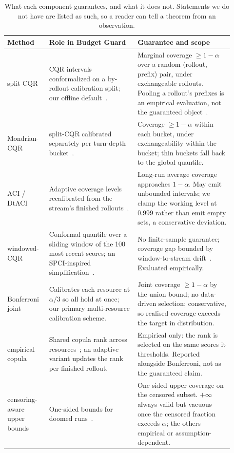 \documentclass{article}
\begin{document}
\begin{table}[t]
\centering
\caption{What each component guarantees, and what it does not. Statements we do not have are listed as such, so a reader can tell a theorem from an observation.}
\label{tab:guarantees}
\footnotesize
\begin{tabular}{@{}p{0.17\linewidth}p{0.36\linewidth}p{0.39\linewidth}@{}}
\toprule
Method & Role in Budget Guard & Guarantee and scope \\
\midrule
split-CQR & CQR intervals conformalized on a by-rollout calibration split; our offline default~\cite{romano2019cqr}. & Marginal coverage $\ge 1{-}\alpha$ over a random (rollout, prefix) pair, under exchangeable rollouts. Pooling a rollout's prefixes is an empirical evaluation, not the guaranteed object~\cite{lei2018distribution}. \\
Mondrian-CQR & split-CQR calibrated separately per turn-depth bucket~\cite{vovk2012conditional}. & Coverage $\ge 1{-}\alpha$ within each bucket, under exchangeability within the bucket; thin buckets fall back to the global quantile. \\
ACI / DtACI & Adaptive coverage levels recalibrated from the stream's finished rollouts~\cite{gibbs2021aci,gibbs2024dtaci}. & Long-run average coverage approaches $1{-}\alpha$. May emit unbounded intervals; we clamp the working level at 0.999 rather than emit empty sets, a conservative deviation. \\
windowed-CQR & Conformal quantile over a sliding window of the 100 most recent scores; an SPCI-inspired simplification~\cite{xu2023spci}. & No finite-sample guarantee; coverage gap bounded by window-to-stream drift~\cite{barber2023beyond}. Evaluated empirically. \\
Bonferroni joint & Calibrates each resource at $\alpha/3$ so all hold at once; our primary multi-resource calibration scheme. & Joint coverage $\ge 1{-}\alpha$ by the union bound; no data-driven selection; conservative, so realised coverage exceeds the target in distribution. \\
empirical copula & Shared copula rank across resources~\cite{messoudi2021copula}; an adaptive variant updates the rank per finished rollout. & Empirical only: the rank is selected on the same scores it thresholds. Reported alongside Bonferroni, not as the guaranteed claim. \\
censoring-aware upper bounds & One-sided bounds for doomed runs~\cite{gui2024conformalized,robins1992recovery,kaplan1958nonparametric}. & One-sided upper coverage on the censored subset. $+\infty$ always valid but vacuous once the censored fraction exceeds $\alpha$; the others empirical or assumption-dependent. \\

\end{tabular}
\end{table}
\end{document}
